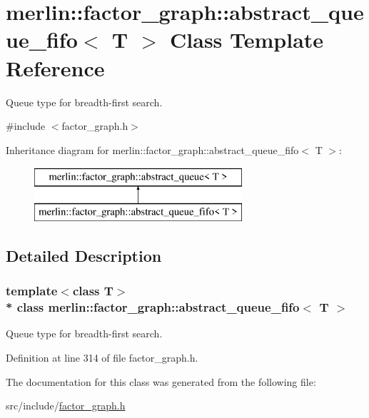 \hypertarget{classmerlin_1_1factor__graph_1_1abstract__queue__fifo}{}\section{merlin\+:\+:factor\+\_\+graph\+:\+:abstract\+\_\+queue\+\_\+fifo$<$ T $>$ Class Template Reference}
\label{classmerlin_1_1factor__graph_1_1abstract__queue__fifo}


Queue type for breadth-\/first search.  




{\ttfamily \#include $<$factor\+\_\+graph.\+h$>$}

Inheritance diagram for merlin\+:\+:factor\+\_\+graph\+:\+:abstract\+\_\+queue\+\_\+fifo$<$ T $>$\+:\begin{figure}[H]
\begin{center}
\leavevmode
\includegraphics[height=2.000000cm]{classmerlin_1_1factor__graph_1_1abstract__queue__fifo}
\end{center}
\end{figure}


\subsection{Detailed Description}
\subsubsection*{template$<$class T$>$\\*
class merlin\+::factor\+\_\+graph\+::abstract\+\_\+queue\+\_\+fifo$<$ T $>$}

Queue type for breadth-\/first search. 

Definition at line 314 of file factor\+\_\+graph.\+h.



The documentation for this class was generated from the following file\+:\begin{DoxyCompactItemize}
\item 
src/include/\hyperlink{factor__graph_8h}{factor\+\_\+graph.\+h}\end{DoxyCompactItemize}

